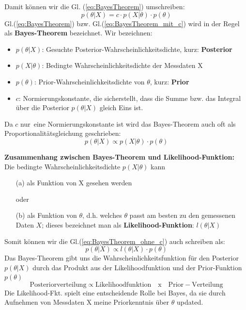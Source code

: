 Damit können wir die Gl. (\ref{eq:BayesTheorem}) umschreiben:
\begin{equation}
p(\theta | X) = c \cdot p(X|\theta) \cdot p(\theta)
\label{eq:BayesTheorem_mit_c}
\end{equation}
Gl.(\ref{eq:BayesTheorem}) bzw. Gl.(\ref{eq:BayesTheorem_mit_c})  wird in der Regel als \textbf{Bayes-Theorem} bezeichnet.
Wir bezeichnen:
\begin{itemize}
	\item $p(\theta| X)$: Gesuchte Posterior-Wahrscheinlichkeitsdichte, kurz:
	\textbf{Posterior}
	\item $p(X |\theta)$: Bedingte Wahrscheinlichkeitsdichte der Messdaten X
	\item $p(\theta)$: Prior-Wahrscheinlichkeitsdichte von $\theta$, kurz: \textbf{Prior}
	\item $c$: Normierungskonstante, die sicherstellt, dass die Summe bzw. das
	Integral über die Posterior $p(\theta|X)$ gleich Eins ist.
\end{itemize}

Da $c$ \glqq nur\grqq ~eine Normierungskonstante ist wird das Bayes-Theorem auch oft
als Proportionalitätsgleichung geschrieben:
\begin{equation}
p(\theta | X) \propto  p(X|\theta) \cdot p(\theta)
\label{eq:BayesTheorem_ohne_c}
\end{equation}

\textbf{Zusammenhang zwischen Bayes-Theorem und Likelihood-Funktion:} \\
Die bedingte Wahrscheinlichkeitsdichte $p(X|\theta)$ kann
\begin{itemize}
	\item[(a)] als Funktion von X gesehen werden
	\item[] oder
	\item[(b)] als Funktion  von $\theta$, d.h. welches $\theta$ passt am
	besten zu den gemessenen Daten $X$; dieses bezeichnet man als \textbf{Likelihood-Funktion}: $l(\theta|X)$
\end{itemize}

Somit können wir die Gl.(\ref{eq:BayesTheorem_ohne_c}) auch schreiben als:
\begin{equation}
p(\theta | X) \propto  l(\theta|X) \cdot p(\theta)
\label{eq:BayesTheorem_mit_Likelihood}
\end{equation}
Das Bayes-Theorem gibt uns die Wahrscheinlichkeitsfunktion für den Posterior
$p(\theta|X)$  durch das Produkt aus der Likelihoodfunktion und der
Prior-Funktion $p(\theta)$
\[
\mathrm{Posteriorverteilung} \propto \mathrm{Likelihoodfunktion} \quad
\mathrm{x} \quad
\mathrm{Prior-Verteilung}
 \]
Die Likelihood-Fkt. spielt eine entscheidende Rolle bei Bayes, da sie durch Aufnehmen von Messdaten X meine Priorkenntnis über $\theta$
updated.

